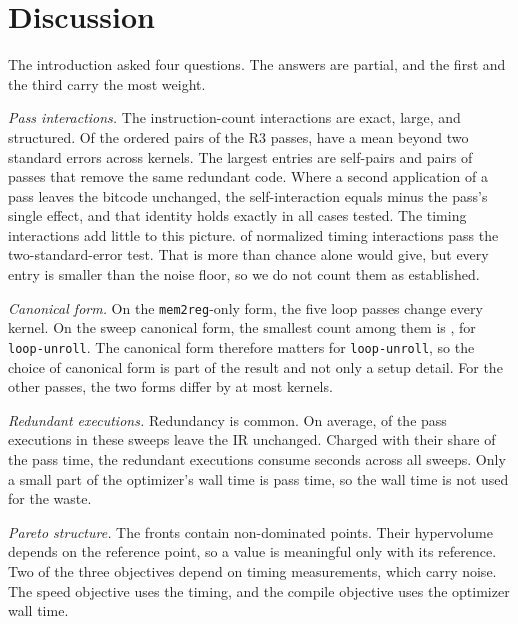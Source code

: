 \section{Discussion}
\label{sec:discussion}

The introduction asked four questions. The answers are partial, and the first and the third carry the most weight.

\emph{Pass interactions.} The instruction-count interactions are exact, large, and structured. Of the \InstInteractionCells{}
ordered pairs of the \NumThreePasses{} R3 passes, \InstInteractionConsistentCells{} have a mean beyond two standard errors across
kernels. The largest entries are self-pairs and pairs of passes that remove the same redundant code. Where a second application of a
pass leaves the bitcode unchanged, the self-interaction equals minus the pass's single effect, and that identity holds exactly in
all \InstSelfIdentityCases{} cases tested. The timing interactions add little to this picture. \InteractionSignificantCells{} of
\InteractionCells{} normalized timing interactions pass the two-standard-error test. That is more than chance alone would give, but
every entry is smaller than the noise floor, so we do not count them as established.

\emph{Canonical form.} On the \texttt{mem2reg}-only form, the five loop passes change every kernel. On the sweep canonical form, the
smallest count among them is \PassChecksLoopMinCanonical{}, for \texttt{loop-unroll}. The canonical form therefore matters for
\texttt{loop-unroll}, so the choice of canonical form is part of the result and not only a setup detail. For the other passes, the
two forms differ by at most \PassChecksOtherMaxDiff{} kernels.

\emph{Redundant executions.} Redundancy is common. On average, \RpbOverallMean{} of the pass executions in these sweeps leave the IR
unchanged. Charged with their share of the pass time, the redundant executions consume \WasteTotalSeconds{} seconds across all
sweeps. Only a small part of the optimizer's wall time is pass time, so the wall time is not used for the waste.

\emph{Pareto structure.} The fronts contain \ParetoPoints{} non-dominated points. Their hypervolume depends on the reference point,
so a value is meaningful only with its reference. Two of the three objectives depend on timing measurements, which carry noise. The speed objective uses
the timing, and the compile objective uses the optimizer wall time.

